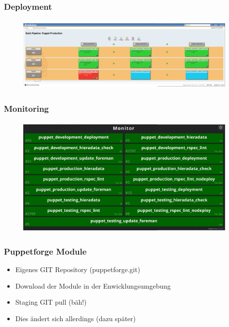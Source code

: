\documentclass{beamer}
\begin{document}
\begin{frame}
  \frametitle{Deployment}
  \begin{figure}[ht]
    \centering
      \includegraphics[height=3.8cm,width=11cm]{../pics/jenkins_pipeline}
    \label{fig:stack}
  \end{figure}
\end{frame}

\begin{frame}
  \frametitle{Monitoring}
  \begin{figure}[ht]
    \centering
      \includegraphics[height=6cm,width=11cm]{../pics/jenkins_monitor.png}
    \label{fig:stack}
  \end{figure}
\end{frame}


\begin{frame}
\end{frame}

\begin{frame}
  \frametitle{Puppetforge Module}

  \begin{itemize}
  \item Eigenes GIT Repository (puppetforge.git)
  \item Download der Module in der Enwicklungsumgebung
  \item Staging GIT pull (bäh!)
  \item Dies ändert sich allerdings (dazu später)
  \end{itemize}
\end{frame}
\end{document}
